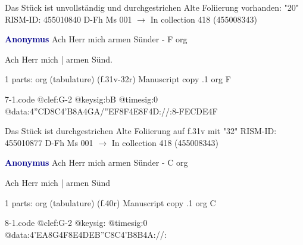 \documentclass[twocolumn]{book}
\begin{document}
\newline Das Stück ist unvollständig und durchgestrichen
\newline Alte Foliierung vorhanden: "20"
\newline RISM-ID: 455010840
\newline D-Fh  Ms 001
\newline $\rightarrow$ In collection 418 (455008343)
      
\newline \par \vspace{7pt} \textcolor{darkblue}{\textbf{Anonymus  }}
\newline Ach Herr mich armen Sünder - F
\newline org
\newline \begin{itshape}[f.31v, at left:] Ach Herr mich | armen Sünd.\end{itshape} 
\newline \textcolor{darkblue}{}  1 parts: org (tabulature)  (f.31v-32r)
\newline Manuscript copy
.1  org  F  
\begin{filecontents*}{7-1.code}
@clef:G-2
@keysig:bB
@timesig:0
@data:4''CD8C4'B8A4GA/''EF8F4E8F4D://:8-FEC{DE}4F
\end{filecontents*}
\newline
%

\newline Das Stück ist durchgestrichen
\newline Alte Foliierung auf f.31v mit "32"
\newline RISM-ID: 455010877
\newline D-Fh  Ms 001
\newline $\rightarrow$ In collection 418 (455008343)
      
\newline \par \vspace{7pt} \textcolor{darkblue}{\textbf{Anonymus  }}
\newline Ach Herr mich armen Sünder - C
\newline org
\newline \begin{itshape}[f.40r, at left:] Ach Herr mich | armen Sünd\end{itshape} 
\newline \textcolor{darkblue}{}  1 parts: org (tabulature)  (f.40r)
\newline Manuscript copy
.1  org  C  
\begin{filecontents*}{8-1.code}
@clef:G-2
@keysig:
@timesig:0
@data:4'EA8G4F8E4DEB''C8C4'B8B4A://:
\end{filecontents*}
\newline
%
\end{document}
